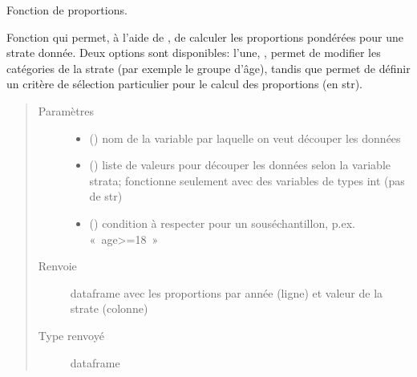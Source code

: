 \documentclass[letterpaper,10pt,french]{sphinxmanual}
\begin{document}
\begin{fulllineitems}
\begin{fulllineitems}
\begin{quote}
\begin{description}
\end{description}\end{quote}

\end{fulllineitems}


\begin{fulllineitems}
\label{\detokenize{code:simgen.statistics.prop}}
Fonction de proportions.

Fonction qui permet, à l’aide de , de calculer les proportions pondérées pour une strate donnée. Deux options sont disponibles: l’une, , permet de modifier les catégories de la strate (par exemple le groupe d’âge), tandis que  permet de définir un critère de sélection particulier pour le calcul des proportions (en str).
\begin{quote}\begin{description}
\item[{Paramètres}] \leavevmode\begin{itemize}
\item {} 
 () \textendash{} nom de la variable par laquelle on veut découper les données

\item {} 
 () \textendash{} liste de valeurs pour découper les données selon la variable strata; fonctionne seulement avec des variables de types int (pas de str)

\item {} 
 () \textendash{} condition à respecter pour un sous\sphinxhyphen{}échantillon, p.ex. « age\textgreater{}=18 »

\end{itemize}

\item[{Renvoie}] \leavevmode
dataframe avec les proportions par année (ligne) et valeur de la strate (colonne)

\item[{Type renvoyé}] \leavevmode
dataframe


\end{description}
\end{quote}
\end{fulllineitems}
\end{fulllineitems}
\end{document}
